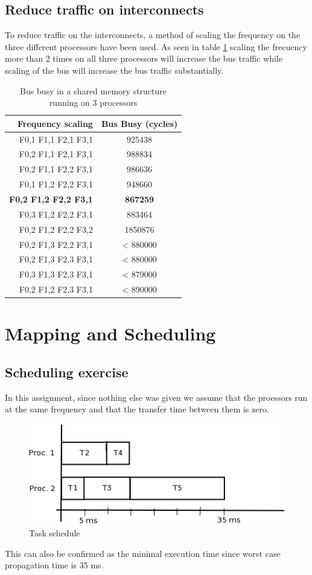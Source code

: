 \documentclass[a4paper, 12pt]{article}
\begin{document}
\subsection{Reduce traffic on interconnects}
To reduce traffic on the interconnects, a method of scaling the
frequency on the three different processors have been used. As seen in
table \ref{tab:busbusy} scaling the frecuency more than 2 times on all three
processors will increase the bus traffic while scaling of the bus will
increase the bus traffic substantially.
\begin{table}[h]
  \centering
  \begin{tabular}[c]{r | c}
    Frequency scaling   & Bus Busy (cycles)\\
    \hline
    F0,1 F1,1 F2,1 F3,1 & 925438\\
    F0,2 F1,1 F2,1 F3,1 & 988834\\
    F0,2 F1,1 F2,2 F3,1 & 986636\\
    F0,1 F1,2 F2,2 F3,1 & 948660\\
    \textbf{F0,2 F1,2 F2,2 F3,1} & \textbf{867259}\\
    F0,3 F1,2 F2,2 F3,1 & 883464\\
    F0,2 F1,2 F2,2 F3,2 & 1850876\\
    F0,2 F1,3 F2,2 F3,1 & < 880000\\
    F0,2 F1,3 F2,3 F3,1 & < 880000\\
    F0,3 F1,3 F2,3 F3,1 & < 879000\\
    F0,2 F1,2 F2,3 F3,1 & < 890000\\
  \end{tabular}
  \caption{Bus busy in a shared memory structure running on 3 processors}
  \label{tab:busbusy}
\end{table}

\section{Mapping and Scheduling}
\subsection{Scheduling exercise}
In this assignment, since nothing else was given we assume that the
proessors run at the same frequency and that the transfer time between
them is zero.
\begin{figure}[h]
  \centering
  \includegraphics{taskSchedule.png}
  \caption{Task schedule}
  \label{fig:schedule}
\end{figure}
 This can also be confirmed as the minimal execution time since worst
 case propagation time is 35 ms. 
\end{document}
